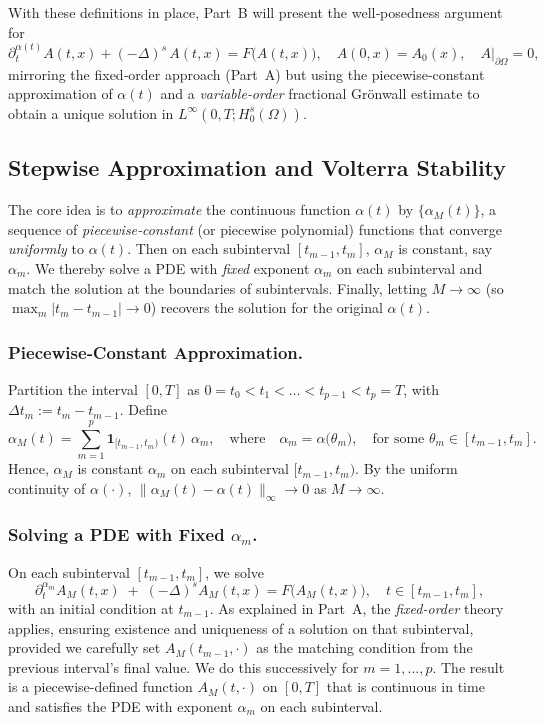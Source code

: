 \documentclass[12pt]{article}
\begin{document}
With these definitions in place, Part~B will present the well‐posedness argument for 
\[
\partial_t^{\alpha(t)} A(t,x)
+ 
(-\Delta)^s\,A(t,x)
=
F\bigl(A(t,x)\bigr),
\quad
A(0,x)=A_0(x),
\quad
A|_{\partial\Omega}=0,
\]
mirroring the fixed‐order approach (Part~A) but using the piecewise‐constant approximation 
of $\alpha(t)$ and a \emph{variable‐order} fractional Gr\"onwall estimate to obtain a 
unique solution in $L^\infty(0,T;H_0^s(\Omega))$.

\subsection{Stepwise Approximation and Volterra Stability}
\label{subsec:stepwise_varalpha}

The core idea is to \emph{approximate} the continuous function \(\alpha(t)\) by
\(\{\alpha_M(t)\}\), a sequence of \emph{piecewise‐constant} (or piecewise polynomial)
functions that converge \emph{uniformly} to \(\alpha(t)\). Then on each subinterval
\([t_{m-1}, t_m]\), \(\alpha_M\) is constant, say \(\alpha_m\). We thereby solve a PDE
with \emph{fixed} exponent \(\alpha_m\) on each subinterval and match the solution at
the boundaries of subintervals. Finally, letting \(M\to\infty\) (so
\(\max_m|t_m-t_{m-1}|\to 0\)) recovers the solution for the original \(\alpha(t)\).

\subsubsection{Piecewise‐Constant Approximation.}
Partition the interval \([0,T]\) as \(0=t_0<t_1<\dots<t_{p-1}<t_p=T\), with
\(\Delta t_m := t_m - t_{m-1}\). Define
\[
\alpha_M(t)
=
\sum_{m=1}^p
  \mathbf{1}_{[t_{m-1}, t_m)}(t)\,\alpha_m,
\quad
\text{where}
\quad
\alpha_m
= \alpha\bigl(\theta_m\bigr),
\quad
\text{for some }\theta_m\in [t_{m-1},t_m].
\]
Hence, \(\alpha_M\) is constant \(\alpha_m\) on each subinterval
\([t_{m-1},t_m)\). By the uniform continuity of \(\alpha(\cdot)\),
\(\|\alpha_M(t) - \alpha(t)\|_{\infty}\to0\) as \(M\to\infty\).

\subsubsection{Solving a PDE with Fixed \(\alpha_m\).}
On each subinterval \([t_{m-1},t_m]\), we solve
\[
\partial_t^{\alpha_m} A_M(t,x)
\;+\;
(-\Delta)^s A_M(t,x)
=
F\bigl(A_M(t,x)\bigr),
\quad
t\in [t_{m-1}, t_m],
\]
with an initial condition at \(t_{m-1}\).  As explained in Part~A, the \emph{fixed-order}
theory applies, ensuring existence and uniqueness of a solution on that subinterval,
provided we carefully set \(A_M(t_{m-1},\cdot)\) as the matching condition from the
previous interval’s final value.  We do this successively for \(m=1,\dots,p\). The result
is a piecewise-defined function \(A_M(t,\cdot)\) on \([0,T]\) that is continuous in time
and satisfies the PDE with exponent \(\alpha_m\) on each subinterval.
\end{document}
